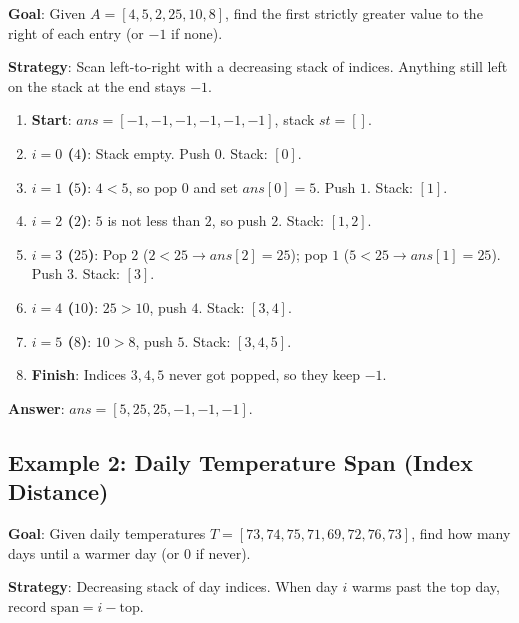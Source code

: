 \documentclass[11pt,a4paper]{article}
\theoremstyle{definition}
\begin{document}
\textbf{Goal}: Given $A = [4, 5, 2, 25, 10, 8]$, find the first strictly greater value to the right of each entry (or $-1$ if none).

\textbf{Strategy}: Scan left-to-right with a decreasing stack of indices. Anything still left on the stack at the end stays $-1$.

\begin{enumerate}
    \item \textbf{Start}: $ans = [-1, -1, -1, -1, -1, -1]$, stack $st = []$.
    \item \textbf{$i = 0$ ($4$)}: Stack empty. Push $0$. Stack: $[0]$.
    \item \textbf{$i = 1$ ($5$)}: $4 < 5$, so pop $0$ and set $ans[0] = 5$. Push $1$. Stack: $[1]$.
    \item \textbf{$i = 2$ ($2$)}: $5$ is not less than $2$, so push $2$. Stack: $[1, 2]$.
    \item \textbf{$i = 3$ ($25$)}: Pop $2$ ($2 < 25 \to ans[2] = 25$); pop $1$ ($5 < 25 \to ans[1] = 25$). Push $3$. Stack: $[3]$.
    \item \textbf{$i = 4$ ($10$)}: $25 > 10$, push $4$. Stack: $[3, 4]$.
    \item \textbf{$i = 5$ ($8$)}: $10 > 8$, push $5$. Stack: $[3, 4, 5]$.
    \item \textbf{Finish}: Indices $3, 4, 5$ never got popped, so they keep $-1$.
\end{enumerate}

\textbf{Answer}: $ans = [5, 25, 25, -1, -1, -1]$.

\subsection{Example 2: Daily Temperature Span (Index Distance)}

\textbf{Goal}: Given daily temperatures $T = [73, 74, 75, 71, 69, 72, 76, 73]$, find how many days until a warmer day (or $0$ if never).

\textbf{Strategy}: Decreasing stack of day indices. When day $i$ warms past the top day, record $\text{span} = i - \text{top}$.
\end{document}
